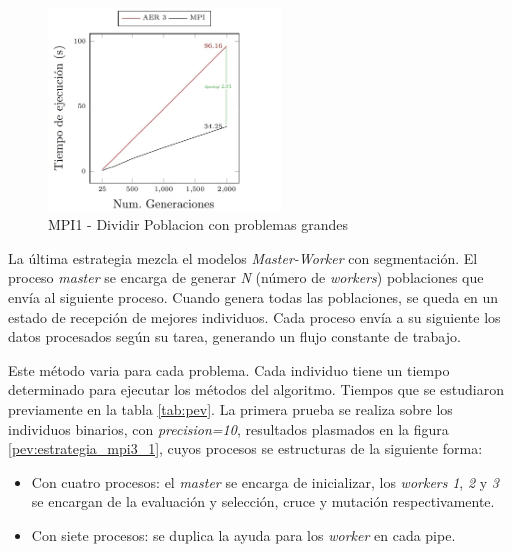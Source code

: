 		
		\begin{figure}[!h]
			\centering
			\includegraphics[width=0.55\textwidth]{images/chapter_4/pev_mpi1}
			\caption{MPI1 - Dividir Poblacion con problemas grandes}
			\label{fig:pev_mpi1_2}			
		\end{figure}
	
		\newpage
	
		

	
		La última estrategia mezcla el modelos \textit{Master-Worker} con segmentación. El proceso \textit{master} se encarga de generar \textit{N} (número de \textit{workers}) poblaciones que envía al siguiente proceso. Cuando genera todas las poblaciones, se queda en un estado de recepción de mejores individuos. Cada proceso envía a su siguiente los datos procesados según su tarea, generando un flujo constante de trabajo.
		
		Este método varia para cada problema. Cada individuo tiene un tiempo determinado para ejecutar los métodos del algoritmo. Tiempos que se estudiaron previamente en la tabla \ref{tab:pev}. La primera prueba se realiza sobre los individuos binarios, con \textit{precision=10}, resultados plasmados en la figura \ref{pev:estrategia_mpi3_1}, cuyos procesos se estructuras de la siguiente forma:
		
		\begin{itemize}
			\item Con cuatro procesos: el \textit{master} se encarga de inicializar, los \textit{workers} \textit{1}, \textit{2} y \textit{3} se encargan de la evaluación y selección, cruce y mutación respectivamente.
			\item Con siete procesos: se duplica la ayuda para los \textit{worker} en cada pipe. 
		\end{itemize}
		
